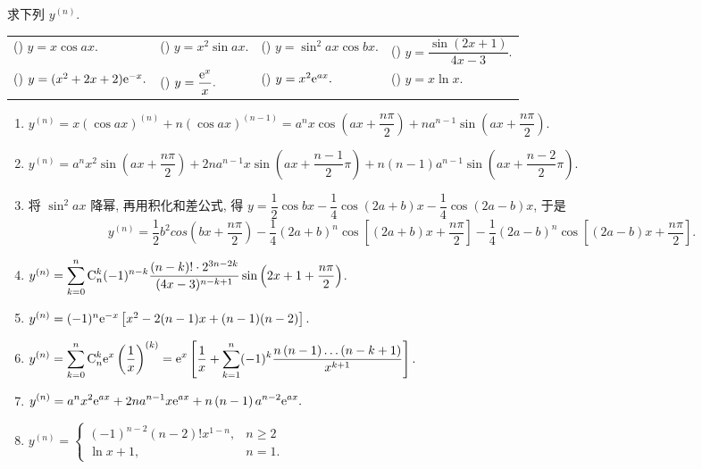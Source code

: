 \begin{example}
    求下列 $y^{(n)}$.
    \setcounter{magicrownumbers}{0}
    \begin{table}[H]
        \centering
        \begin{tabular}{l | l | l | l}
            (\rownumber{}) $y=x\cos ax.$           & (\rownumber{}) $y=x^2\sin ax.$       & (\rownumber{}) $y=\sin^2ax\cos bx.$ & (\rownumber{}) $y=\dfrac{\sin(2x+1)}{4x-3}.$ \\
            (\rownumber{}) $y=(x^2+2x+2)\mathrm{e} ^{-x}.$ & (\rownumber{}) $y=\dfrac{\mathrm{e} ^x}{x}.$ & (\rownumber{}) $y=x^2\mathrm{e} ^{ax}.$     & (\rownumber{}) $y=x\ln x.$
        \end{tabular}
    \end{table}
\end{example}
\begin{solution}
    \begin{enumerate}[label=(\arabic{*})]
        \item $y^{(n)}=x(\cos ax)^{(n)}+n(\cos ax)^{(n-1)}=a^nx\cos\left(ax+\dfrac{n\pi}{2}\right)+na^{n-1}\sin\left(ax+\dfrac{n\pi}{2}\right).$
        \item $y^{(n)}=a^nx^2\sin\left(ax+\dfrac{n\pi}{2}\right)+2na^{n-1}x\sin\left(ax+\dfrac{n-1}{2}\pi\right)+n(n-1)a^{n-1}\sin\left(ax+\dfrac{n-2}{2}\pi\right).$
        \item 将 $\sin^2ax$ 降幂, 再用积化和差公式, 得 $y=\dfrac{1}{2}\cos bx-\dfrac{1}{4}\cos(2a+b)x-\dfrac{1}{4}\cos(2a-b)x$, 于是
              $$y^{(n)}=\frac{1}{2}b^2cos\left(bx+\frac{n\pi}{2}\right)-\frac{1}{4}(2a+b)^n\cos\left[(2a+b)x+\frac{n\pi}{2}\right]-\frac{1}{4}(2a-b)^n\cos\left[(2a-b)x+\frac{n\pi}{2}\right].$$
        \item $y^{(n)}=\displaystyle \sum_{k=0}^{n}\mathrm{C}_n^k(-1)^{n-k}\dfrac{(n-k)!\cdot 2^{3n-2k}}{(4x-3)^{n-k+1}}\sin\qty(2x+1+\dfrac{n\pi}{2})$.
        \item $y^{(n)}=(-1)^n\mathrm{e} ^{-x}\left[x^2-2(n-1)x+(n-1)(n-2)\right].$
        \item $\displaystyle y^{(n) }=\sum ^{n}_{k=0}\mathrm{C}_{n}^{k}\mathrm{e} ^{x}\left( \dfrac{1}{x}\right) ^{\left( k\right) }=\mathrm{e} ^{x}\left[ \dfrac{1}{x}+\sum ^{n}_{k=1}(-1) ^{k}\dfrac{n\left( n-1\right) \ldots \left( n-k+1\right) }{x^{k+1}}\right] .$
        \item $\displaystyle y^{(n)} =a^{n}x^{2}\mathrm{e} ^{ax}+2na^{n-1}x\mathrm{e} ^{ax}+n\left( n-1\right) a^{n-2}\mathrm{e} ^{ax}.$
        \item $\displaystyle y^{(n) }=\begin{cases}
                      (-1)^{n-2}(n-2)!x^{1-n}, & n\geqslant 2 \\ \ln x+1,&n=1.
                  \end{cases} $
    \end{enumerate}
\end{solution}

